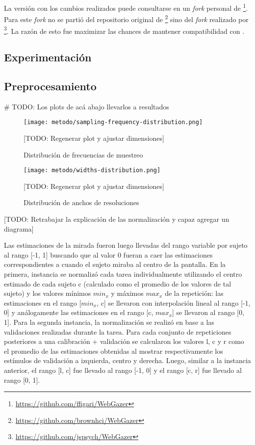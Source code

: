 La versión con los cambios realizados puede consultarse en un \textit{fork}
personal de \webgazer\footnote{\url{https://github.com/ffigari/WebGazer}}.
Para este \textit{fork} no se partió del repositorio original de
\webgazer\footnote{\url{https://github.com/brownhci/WebGazer}} sino del
\textit{fork} realizado por
\jspsych\footnote{\url{https://github.com/jspsych/WebGazer}}.
La razón de esto fue maximizar las chances de mantener compatibilidad con
\jspsych.

\subsection{Experimentación}
\subsection{Preprocesamiento} \label{section:preprocessing}

# TODO: Los plots de acá abajo llevarlos a resultados

\begin{figure}
  \centering
  \texttt{[image: metodo/sampling-frequency-distribution.png]}
  \caption{Distribución de frecuencias de muestreo}
  [TODO: Regenerar plot y ajustar dimensiones]
  \label{fig:sampling-frequency-distribution}
\end{figure}

\begin{figure}
  \centering
  \texttt{[image: metodo/widths-distribution.png]}
  \caption{Distribución de anchos de resoluciones}
  [TODO: Regenerar plot y ajustar dimensiones]
  \label{fig:widths-distribution}
\end{figure}

[TODO: Retrabajar la explicación de las normalización y capaz agregar un diagrama]

Las estimaciones de la mirada fueron luego llevadas del rango variable por
sujeto al rango [-1, 1] buscando que al valor 0 fueran a caer las estimaciones
correspondientes a cuando el sujeto miraba al centro de la pantalla.
En la primera, instancia se normalizó cada tarea individualmente utilizando el
centro estimado de cada sujeto c (calculado como el promedio de los valores de
tal sujeto) y los valores mínimos $min_x$ y máximos $max_x$ de la repetición:
las estimaciones en el rango [$min_x$, c] se llevaron con interpolación lineal
al rango [-1, 0] y análogamente las estimaciones en el rango [c, $max_x$] se
llevaron al rango [0, 1].
Para la segunda instancia, la normalización se realizó en base a las
validaciones realizadas durante la tarea.
Para cada conjunto de repeticiones posteriores a una calibración + validación
se calcularon los valores l, c y r como el promedio de las estimaciones
obtenidas al mostrar respectivamente los estímulos de validación a izquierda,
centro y derecha.
Luego, similar a la instancia anterior, el rango [l, c] fue llevado al rango
[-1, 0] y el rango [c, r] fue llevado al rango [0, 1].

